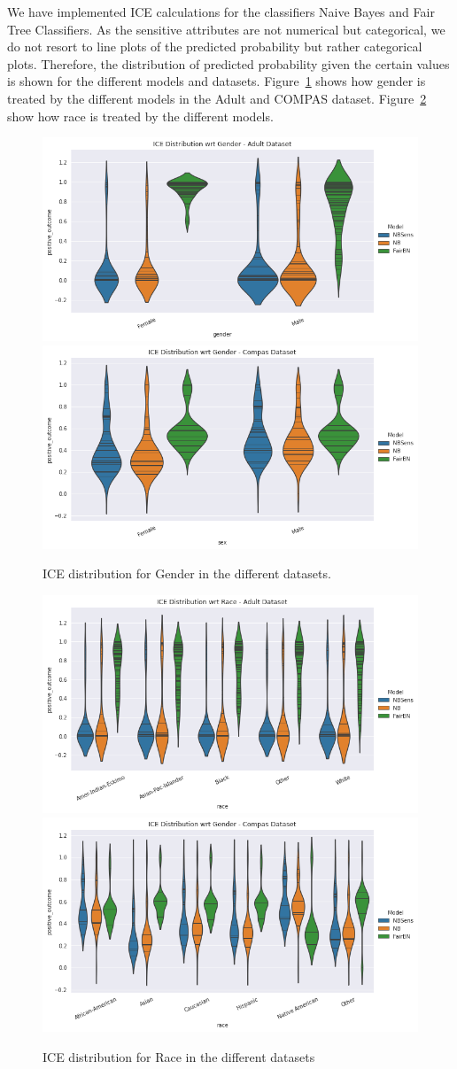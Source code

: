 We have implemented ICE calculations for the classifiers Naive Bayes and Fair Tree Classifiers. As the sensitive attributes are not numerical but categorical, we do not resort to line plots of the predicted probability but rather categorical plots. Therefore, the distribution of predicted probability given the certain values is shown for the different models and datasets. Figure~\ref{fig:ICEdistgender} shows how gender is treated by the different models in the Adult and COMPAS dataset. Figure~\ref{fig:ICEdistrace} show how race is treated by the different models.

\begin{figure}
    \centering
    \includegraphics[width=0.49\linewidth]{figures/ICEdistgender-adult.png}
    \includegraphics[width=0.49\linewidth]{figures/ICEdistgender-compas.png}
    \caption{ICE distribution for Gender in the different datasets.}
    \label{fig:ICEdistgender}
\end{figure}

\begin{figure}
    \centering
    \includegraphics[width=0.49\linewidth]{figures/ICEdistrace-adult.png}
    \includegraphics[width=0.49\linewidth]{figures/ICEdistrace-compas.png}
    \caption{ICE distribution for Race in the different datasets}
    \label{fig:ICEdistrace}
\end{figure}


